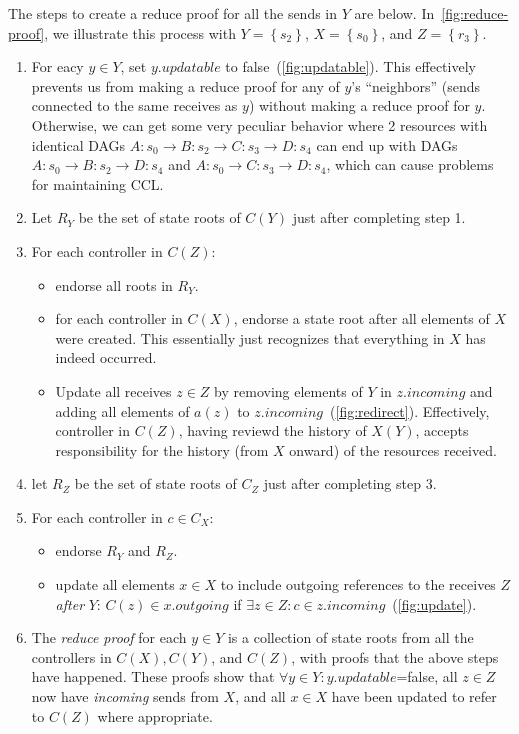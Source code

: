 \documentclass[a4paper,USenglish,cleveref, autoref, thm-restate, anonymous]{lipics-v2021}
\newcommand{\p}[1]{{\ensuremath{\left({{#1}}\right)}}}
\newcommand{\cb}[1]{{\left\{{{#1}}\right\}}}
\begin{document}
The steps to create a reduce proof for all the sends in $Y$ are below. 
In~\cref{fig:reduce-proof}, we illustrate this process with $Y=\cb{s_2}$, $X=\cb{s_0}$, and $Z=\cb{r_3}$. 
\begin{enumerate}
\item For eacy $y\in Y$, set $y.updatable$ to false~(\cref{fig:updatable}). This effectively prevents us from making a reduce proof for any of $y$'s ``neighbors'' (sends connected to the same receives as $y$) without making a reduce proof for $y$.
  Otherwise, we can get some very peculiar behavior where 2 resources with identical DAGs $A:s_0\rightarrow B:s_2 \rightarrow C:s_3 \rightarrow D:s_4$ can end up with DAGs $A:s_0 \rightarrow B:s_2 \rightarrow D:s_4$ and $A:s_0\rightarrow C:s_3 \rightarrow D:s_4$, which can cause problems for maintaining CCL.
\item Let $R_Y$ be the set of state roots of $C\p Y$ just after completing step 1.
\item For each controller in $C\p Z$:
  \begin{itemize}
    \item endorse all roots in $R_Y$.
    \item for each controller in $C\p X$, endorse a state root after all elements of $X$ were created. This essentially just recognizes that everything in $X$ has indeed occurred. 
    \item Update all receives $z \in Z$ by removing elements of $Y$ in $z.incoming$ and adding all elements of $a\p z$ to $z.incoming$~(\cref{fig:redirect}).
      Effectively, controller in $C\p Z$, having reviewd the history of $X\p Y$, accepts responsibility for the history (from $X$ onward) of the resources received.
  \end{itemize}
\item let $R_Z$ be the set of state roots of $C_Z$ just after completing step 3.
\item For each controller in $c \in C_X$:
  \begin{itemize}
     \item endorse $R_Y$ and $R_Z$.
     \item update all elements $x\in X$ to include outgoing references to the receives $Z$ \emph{after} $Y$:  $C\p z \in x.outgoing$ if $\exists z \in Z : c \in z.incoming$~(\cref{fig:update}). 
  \end{itemize}
\item The \emph{reduce proof} for each $y\in Y$ is a collection of state roots from all the controllers in $C\p X, C\p Y$, and $C\p Z$, with proofs that the above steps have happened.
      These proofs show that $\forall y\in Y: y.updatable$=false, all $z\in Z$ now have \emph{incoming} sends from $X$, and all $x\in X$ have been updated to refer to $C\p Z$ where appropriate. 
\end{enumerate}
\end{document}

